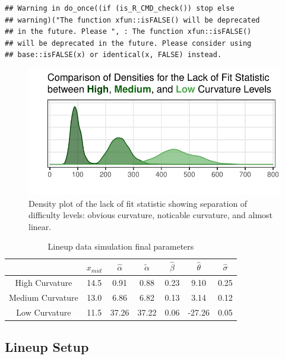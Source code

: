 \documentclass[12pt]{article}
\begin{document}
\begin{verbatim}
## Warning in do_once((if (is_R_CMD_check()) stop else
## warning)("The function xfun::isFALSE() will be deprecated
## in the future. Please ", : The function xfun::isFALSE()
## will be deprecated in the future. Please consider using
## base::isFALSE(x) or identical(x, FALSE) instead.
\end{verbatim}

\begin{figure}[tbp]

{\centering \includegraphics[width=1\linewidth,]{logarithmic-lineups_files/figure-latex/lof-density-curves-1} 

}

\caption[Lineup parameter selection]{Density plot of the lack of fit statistic showing separation of difficulty levels: obvious curvature, noticable curvature, and almost linear.}\label{fig:lof-density-curves}
\end{figure}

\begin{table}

\caption{\label{tab:parameter-data}Lineup data simulation final parameters}
\centering
\begin{tabular}[t]{ccccccc}
\toprule
 & $x_{mid}$ & $\hat\alpha$ & $\tilde\alpha$ & $\hat\beta$ & $\hat\theta$ & $\hat\sigma$\\
\midrule
High Curvature & 14.5 & 0.91 & 0.88 & 0.23 & 9.10 & 0.25\\
Medium Curvature & 13.0 & 6.86 & 6.82 & 0.13 & 3.14 & 0.12\\
Low Curvature & 11.5 & 37.26 & 37.22 & 0.06 & -27.26 & 0.05\\
\bottomrule
\end{tabular}
\end{table}

\hypertarget{lineup-setup}{%
\subsection{Lineup Setup}\label{lineup-setup}}
\end{document}
